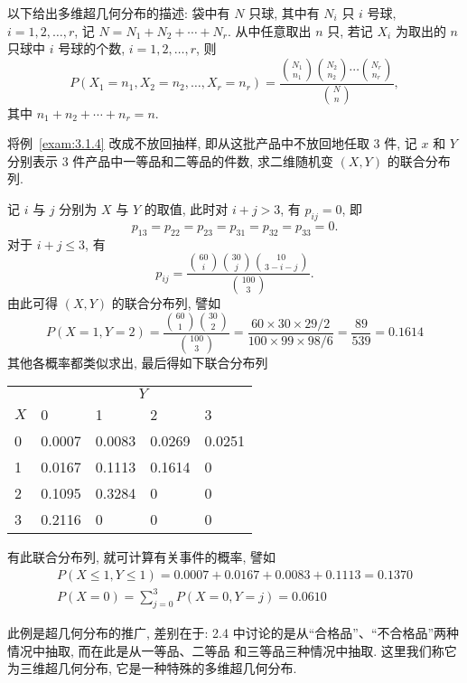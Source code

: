   以下给出多维超几何分布的描述: 袋中有 $N$ 只球, 其中有 $N_i$ 只 $i$ 号球, $i=1,2,\ldots,r$,
 记 $N=N_1+N_2+\cdots+N_r$. 从中任意取出 $n$ 只, 若记 $X_i$ 为取出的 $n$ 只球中 $i$ 号球的个数, $i=1,2,\ldots,r$, 则
 \begin{equation}\label{eq:3.1.6}
  	P(X_1=n_1,X_2=n_2,\ldots,X_r=n_r)=\frac	{\binom{N_1}{n_1}\binom{N_2}{n_2}\cdots\binom{N_r}{n_r}}{\binom{N}{n}},
 \end{equation}
 其中 $n_1+n_2+\cdots+n_r=n$.
 \begin{example}\label{exam:3.1.5}
 将例~\ref{exam:3.1.4} 改成不放回抽样, 即从这批产品中不放回地任取 3 件, 记 $x$ 和 $Y$ 分别表示 3 件产品中一等品和二等品的件数,
 求二维随机变 $(X,Y)$ 的联合分布列.
 \end{example}
 \begin{solution}
记 $i$ 与 $j$ 分别为 $X$ 与 $Y$ 的取值, 此时对 $i+j>3$, 有 $p_{ij}=0$, 即
\[
	p_{13}=p_{22}=p_{23}=p_{31}=p_{32}=p_{33}=0.
\]
对于 $i+j\leq 3$, 有
\[
	p_{ij}=\frac{\binom{60}{i}\binom{30}{j}\binom{10}{3-i-j}}{\binom{100}{3}}.
\]
由此可得 $(X,Y)$ 的联合分布列, 譬如
\[
P(X=1, Y=2)=\frac{\binom{60}{1}\binom{30}{2}}{\binom{100}{3}}
=\frac{60 \times 30 \times 29 / 2}{100 \times 99 \times 98 / 6}=\frac{89}{539}=0.1614
\]
其他各概率都类似求出, 最后得如下联合分布列
\begin{center}
\begin{tabularx}{0.8\textwidth}{ZZZZZ}
\toprule
&	\\
$X$	&	0&	1&	2&	3		\\
	&	0.0007&	0.0083&	0.0269&	0.0251	\\
	&	0.0167&	0.1113&	0.1614&	0		\\
	&	0.1095&	0.3284&	0&		0		\\
	&	0.2116&	0&		0&		0		\\			
\bottomrule
\end{tabularx}
\end{center}
有此联合分布列, 就可计算有关事件的概率, 譬如
\[
\begin{gathered}
P(X \leq 1, Y \leq 1)=0.0007+0.0167+0.0083+0.1113=0.1370 \\
P(X=0)=\sum_{j=0}^{3} P(X=0, Y=j)=0.0610
\end{gathered}
\]
\end{solution}
 此例是超几何分布的推广, 差别在于: 2.4 中讨论的是从“合格品”、“不合格品”两种情况中抽取, 而在此是从一等品、二等品
 和三等品三种情况中抽取. 这里我们称它为三维超几何分布, 它是一种特殊的多维超几何分布.

